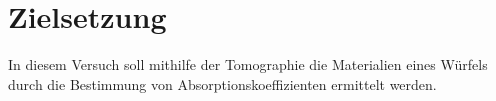 \section{Zielsetzung}
\label{sec:Zielsetzung}
In diesem Versuch soll mithilfe der Tomographie die Materialien eines Würfels durch die
Bestimmung von Absorptionskoeffizienten ermittelt werden.

